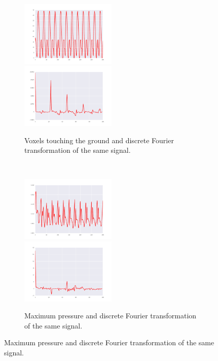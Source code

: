 \documentclass{sig-alternate}
\begin{document}
\begin{figure}[t!]
\begin{subfigure}[t]{0.23\textwidth}
\centering
\includegraphics[width=0.5\textwidth]{../Figures/Behaviors/vtg.pdf}~
\includegraphics[width=0.5\textwidth]{../Figures/Behaviors/vtgdft.pdf}
\caption{Voxels touching the ground and discrete Fourier transformation of the same signal.}
\end{subfigure}\\
\begin{subfigure}[t]{0.23\textwidth}
\centering
\includegraphics[width=0.5\textwidth]{../Figures/Behaviors/pr.pdf}~
\includegraphics[width=0.5\textwidth]{../Figures/Behaviors/prdft.pdf}
\caption{Maximum pressure and discrete Fourier transformation of the same signal.}

\end{subfigure}
\end{figure}
\end{document}

